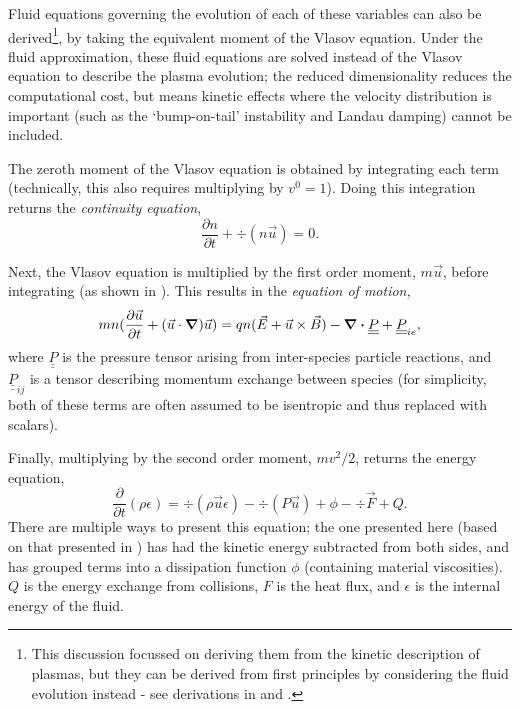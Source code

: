 Fluid equations governing the evolution of each of these variables can also be derived\footnote{This discussion focussed on deriving them from the kinetic description of plasmas, but they can be derived from first principles by considering the fluid evolution instead - see derivations in \cite{Chen2015} and \cite{Piel2017}.}, by taking the equivalent moment of the Vlasov equation. Under the fluid approximation, these fluid equations are solved instead of the Vlasov equation to describe the plasma evolution; the reduced dimensionality reduces the computational cost, but means kinetic effects where the velocity distribution is important (such as the `bump-on-tail' instability and Landau damping) cannot be included.

The zeroth moment of the Vlasov equation is obtained by integrating each term (technically, this also requires multiplying by $v^0 = 1$). Doing this integration returns the \textit{continuity equation},
\begin{equation} \frac{\partial n}{\partial t} + \div (n \vec{u}) = 0. \end{equation}

Next, the Vlasov equation is multiplied by the first order moment, $m\vec{u}$, before integrating (as shown in \cite{Chen2015}). This results in the \textit{equation of motion,}
\begin{equation} mn(\frac{\partial \vec{u}}{\partial t} + (\vec{u} \cdot \grad)\vec{u}) = qn(\vec{E} + \vec{u} \times \vec{B}) - \div \underline{\underline{P}} + \underline{\underline{P}}_{ie} ,\end{equation}
where $\underline{\underline{P}}$ is the pressure tensor arising from inter-species particle reactions, and $\underline{\underline{P}}_{ij}$ is a tensor describing momentum exchange between species (for simplicity, both of these terms are often assumed to be isentropic and thus replaced with scalars).

Finally, multiplying by the second order moment, $mv^2 / 2$, returns the energy equation,
\begin{equation} \frac{ \partial}{\partial t} (\rho \epsilon) = \div (\rho \vec{u} \epsilon) - \div (P \vec{u}) + \phi - \div \vec{F} + Q. \label{eqn: Energy equation} \end{equation}
There are multiple ways to present this equation; the one presented here (based on that presented in \cite{Colvin2013}) has had the kinetic energy subtracted from both sides, and has grouped terms into a dissipation function $\phi$ (containing material viscosities). $Q$ is the energy exchange from collisions, $F$ is the heat flux, and $\epsilon$ is the internal energy of the fluid.

